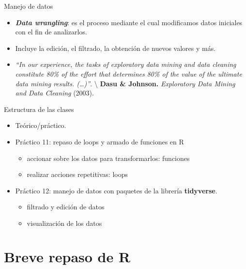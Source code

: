 \documentclass[
  10pt,
  ignorenonframetext,
]{beamer}
\providecommand{\tightlist}{%
  \setlength{\itemsep}{0pt}\setlength{\parskip}{0pt}}
\begin{document}
\begin{frame}{Manejo de datos}
\protect\hypertarget{manejo-de-datos}{}
\begin{itemize}
\tightlist
\item
  \textbf{\emph{Data wrangling}}: es el proceso mediante el cual
  modificamos datos iniciales con el fin de analizarlos. \vspace{15pt}
\item
  Incluye la edición, el filtrado, la obtención de nuevos valores y más.
  \vspace{15pt}
\item
  \emph{``In our experience, the tasks of exploratory data mining and
  data cleaning constitute 80\% of the effort that determines 80\% of
  the value of the ultimate data mining results. (\ldots)''}.
  \textbackslash{} \textbf{Dasu \& Johnson.} \emph{Exploratory Data
  Mining and Data Cleaning} (2003).
\end{itemize}
\end{frame}

\begin{frame}{Estructura de las clases}
\protect\hypertarget{estructura-de-las-clases}{}
\begin{itemize}
\item
  Teórico/práctico. \vspace{12pt}
\item
  Práctico 11: repaso de loops y armado de funciones en R

  \begin{itemize}
  \tightlist
  \item
    accionar sobre los datos para transformarlos: funciones
  \item
    realizar acciones repetitivas: loops \vspace{12pt}
  \end{itemize}
\item
  Práctico 12: manejo de datos con paquetes de la librería
  \textbf{tidyverse}.

  \begin{itemize}
  \tightlist
  \item
    filtrado y edición de datos
  \item
    visualización de los datos
  \end{itemize}
\end{itemize}
\end{frame}

\hypertarget{breve-repaso-de-r}{%
\section{Breve repaso de R}\label{breve-repaso-de-r}}
\end{document}
